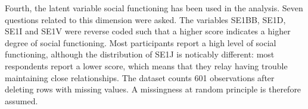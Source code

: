 \documentclass[11pt]{article}
\begin{document}
\begin{table}[h!]
\captionsetup{singlelinecheck=off}
\caption{Self-directedness indicators}
\end{table}

\begin{table}[h!]
\captionsetup{singlelinecheck=off}
\caption{Self-directedness distribution}
\end{table}

Fourth, the latent variable social functioning has been used in the analysis.
Seven questions related to this dimension were asked. The variables SE1BB, SE1D,
SE1I and SE1V were reverse coded such that a higher score indicates a higher
degree of social functioning. Most participants report a high level of social
functioning, although the distribution of SE1J is noticably different: most
respondents report a lower score, which means that they relay having trouble
maintaining close relationships. The dataset counts 601 observations after
deleting rows with missing values. A missingness at random principle is
therefore assumed.
\end{document}

